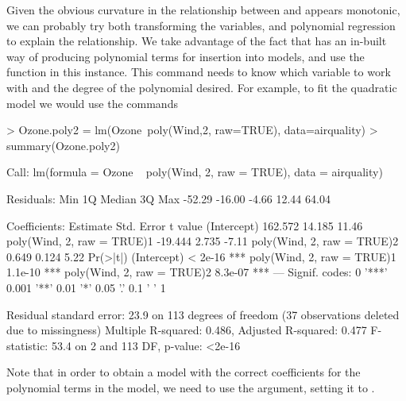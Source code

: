 Given the obvious curvature in the relationship between  and  appears monotonic, we can probably try both transforming the variables, and polynomial regression to explain the relationship. We take advantage of the 
fact that \R{} has an in-built way of producing polynomial terms for insertion into models, and use the  function in this instance. This command needs to know which variable to work with and the degree of the polynomial desired. For example, to fit the quadratic model we would use the commands
\begin{Schunk}
\begin{Sinput}
> Ozone.poly2 = lm(Ozone~poly(Wind,2, raw=TRUE), data=airquality)
> summary(Ozone.poly2)
\end{Sinput}
\begin{Soutput}

Call:
lm(formula = Ozone ~ poly(Wind, 2, raw = TRUE), data = airquality)

Residuals:
   Min     1Q Median     3Q    Max 
-52.29 -16.00  -4.66  12.44  64.04 

Coefficients:
                           Estimate Std. Error t value
(Intercept)                 162.572     14.185   11.46
poly(Wind, 2, raw = TRUE)1  -19.444      2.735   -7.11
poly(Wind, 2, raw = TRUE)2    0.649      0.124    5.22
                           Pr(>|t|)    
(Intercept)                 < 2e-16 ***
poly(Wind, 2, raw = TRUE)1  1.1e-10 ***
poly(Wind, 2, raw = TRUE)2  8.3e-07 ***
---
Signif. codes:  
0 '***' 0.001 '**' 0.01 '*' 0.05 '.' 0.1 ' ' 1

Residual standard error: 23.9 on 113 degrees of freedom
  (37 observations deleted due to missingness)
Multiple R-squared:  0.486,	Adjusted R-squared:  0.477 
F-statistic: 53.4 on 2 and 113 DF,  p-value: <2e-16
\end{Soutput}
\end{Schunk}
Note that in order to obtain a model with the correct coefficients for the polynomial terms in the model, we need to use the  argument, setting it to . 

